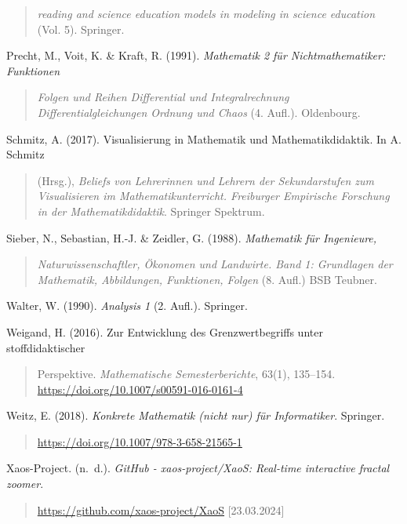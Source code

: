 \documentclass[a4paper, 12pt]{book}
\begin{document}
\begin{quote}
\emph{reading and science education models in modeling in science
education} (Vol. 5). Springer.
\end{quote}

Precht, M., Voit, K. \& Kraft, R. (1991). \emph{Mathematik 2 für
Nichtmathematiker: Funktionen}

\begin{quote}
\emph{Folgen und Reihen Differential und Integralrechnung
Differentialgleichungen Ordnung und Chaos} (4. Aufl.). Oldenbourg.
\end{quote}

Schmitz, A. (2017). Visualisierung in Mathematik und Mathematikdidaktik.
In A. Schmitz

\begin{quote}
(Hrsg.), \emph{Beliefs von Lehrerinnen und Lehrern der Sekundarstufen
zum Visualisieren im Mathematikunterricht. Freiburger Empirische
Forschung in der Mathematikdidaktik}. Springer Spektrum.
\end{quote}

Sieber, N., Sebastian, H.-J. \& Zeidler, G. (1988). \emph{Mathematik für
Ingenieure,}

\begin{quote}
\emph{Naturwissenschaftler, Ökonomen und Landwirte. Band 1: Grundlagen
der Mathematik, Abbildungen, Funktionen, Folgen} (8. Aufl.) BSB Teubner.
\end{quote}

Walter, W. (1990). \emph{Analysis 1} (2. Aufl.). Springer.

Weigand, H. (2016). Zur Entwicklung des Grenzwertbegriffs unter
stoffdidaktischer

\begin{quote}
Perspektive. \emph{Mathematische Semesterberichte}, 63(1), 135--154.
\url{https://doi.org/10.1007/s00591-016-0161-4}
\end{quote}

Weitz, E. (2018). \emph{Konkrete Mathematik (nicht nur) für
Informatiker}. Springer.

\begin{quote}
\url{https://doi.org/10.1007/978-3-658-21565-1}
\end{quote}

Xaos-Project. (n.~d.). \emph{GitHub - xaos-project/XaoS: Real-time
interactive fractal zoomer}.

\begin{quote}
\url{https://github.com/xaos-project/XaoS} {[}23.03.2024{]}
\end{quote}
\end{document}

